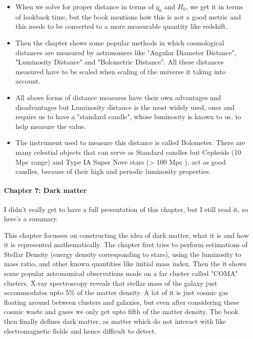 \documentclass[11pt]{article}
\begin{document}
\begin{itemize}
	\item When we solve for proper distance in terms of $q_0$ and $H_0$, we
		get it in terms of lookback time, but the book mentions how this
		is not a good metric and this needs to be converted to a more
		measurable quantity like redshift.
	\item Then the chapter shows some popular methods in which cosmological
		distances are measured by astronomers like "Angular Diameter
		Distance", "Luminosity Distance" and "Bolometric Distance".
		All these distances measured have to be scaled when scaling of
		the universe it taking into account.
	\item All above forms of distance measures have their own advantages and
		disadvantages but Luminosity distance is the most widely used,
		ones and require us to have a "standard candle", whose
		luminosity is known to us, to help measure the value.
	\item The instrument used to measure this distance is called Bolometer.
		There are many celestial objects that can serve as Standard
		candles but Cepheids (10 Mpc range) and Type IA Super Nove stars
		(> 100 Mpc ), act as good candles, because of their high and periodic
		luminosity properties.
\end{itemize}

\paragraph{Chapter 7: Dark matter}

I didn't really get to have a full presentation of this chapter, but I still
read it, so here's a summary.

This chapter focusses on constructing the idea of dark matter, what it is and
how it is represented mathematically. The chapter first tries to perform
estimations of Stellar Density (energy density corresponding to stars), using
the luminosity to mass ratio, and other known quantities like initial mass
index. Then the it shows some popular astronomical observations made on a far
cluster called "COMA" clusters. X-ray spectroscopy reveals that stellar mass of
the galaxy just accommodates upto 5\% of the matter density. A lot of it is just
cosmic gas floating around between clusters and galaxies, but even after
considering these cosmic waste and gases we only get upto fifth of the matter
density. The book then finally
defines dark matter, as matter which do not interact with
like electromagnetic fields and hence difficult to detect.
\end{document}
